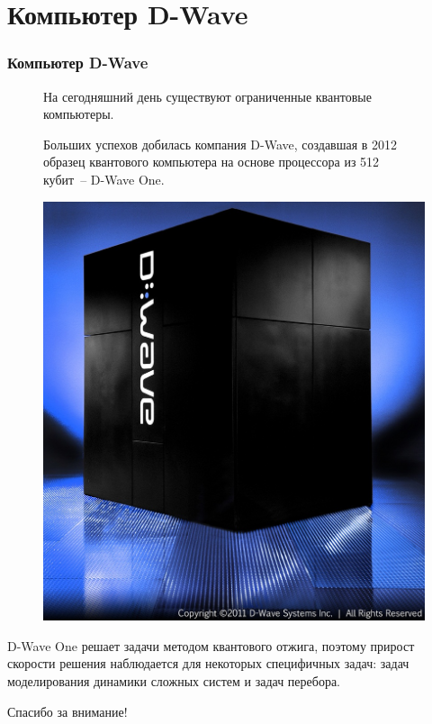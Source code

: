 \documentclass[12pt,pdf]{beamer}
\renewcommand{\~}[1]{\widetilde{#1}}
\begin{document}
  \section{Компьютер D-Wave}
  \begin{frame}
    \frametitle{Компьютер D-Wave}
    \begin{figure}
      \begin{minipage}{.6\textwidth}
        На сегодняшний день существуют ограниченные квантовые компьютеры.
      
        Больших успехов добилась компания D-Wave, создавшая в 2012 образец
        квантового компьютера на основе процессора из 512 кубит~-- D-Wave One.
      \end{minipage}
      \hfill
      \begin{minipage}{.35\textwidth}
        \includegraphics[width=\textwidth]{d-wave_blue}
      \end{minipage}
    \end{figure}
    
    D-Wave One решает задачи методом квантового отжига, поэтому прирост
    скорости решения наблюдается для некоторых специфичных задач:
    задач моделирования динамики сложных систем и задач перебора.
  \end{frame}

  \begin{frame}
    \Huge\centering Спасибо за внимание!
  \end{frame}
\end{document}
